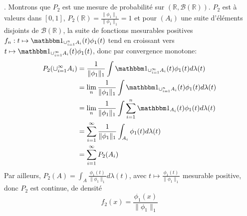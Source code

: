 \documentclass{report}
\begin{document}
\subsection{} \noindent{}\\ 
\\ 
\\
. Montrons que $P_2$ est une mesure de probabilité sur $(\mathbb R, \mathcal B(\mathbb R))$.\newline
$P_2$ est à valeurs dans $[0,1]$, $P_2(\mathbb R)= \frac{\|\phi_1\|_1}{\|\phi_1\|_1}=1$ et pour $(A_i)$ une suite d'éléments disjoints de $\mathcal B(\mathbb R)$, la suite de fonctions mesurables positives \newline 
$f_n:t\mapsto \mathbbm 1_{\cup_{i=1}^n A_i}(t) \phi_1(t)$ tend en croissant vers $t\mapsto \mathbbm 1_{\cup_{i=1}^\infty A_i}(t) \phi_1(t)$, donc par convergence monotone:
$$\begin{aligned}[t]
P_2(\cup_{i=1}^\infty A_i) &= \frac{1}{\|\phi_1\|_1} \int \mathbbm 1_{\cup_{i=1}^\infty A_i}(t) \phi_1(t) d\lambda(t)\\
&= \lim_n \frac{1}{\|\phi_1\|_1} \int \mathbbm 1_{\cup_{i=1}^n A_i}(t) \phi_1(t) d\lambda(t) \\
&= \lim_n \frac{1}{\|\phi_1\|_1} \int \sum_{i=1}^n \mathbbm 1_{A_i}(t) \phi_1(t) d\lambda(t)\\
&= \sum_{i=1}^\infty \frac{1}{\|\phi_1\|_1}\int_{A_i}  \phi_1(t) d\lambda(t)\\
&= \sum_{i=1}^\infty P_2(A_i)
\end{aligned}$$
Par ailleurs, $\displaystyle P_2(A)=\int_A \frac{\phi_1(t)}{\|\phi_1\|_1} d\lambda(t)$, avec $t\mapsto \frac{\phi_1(t)}{\|\phi_1\|_1}$ mesurable positive, donc $P_2$ est continue, de densité $$f_2(x)=\frac{\phi_1(x)}{\|\phi_1\|_1}$$
\end{document}
